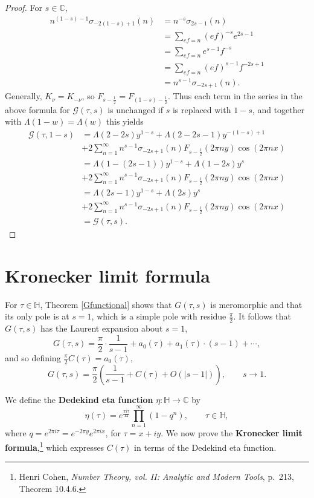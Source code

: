 \documentclass{article}
\theoremstyle{definition}
\begin{document}
\begin{proof}
For $s \in \mathbb{C}$, 
\begin{align*}
n^{(1-s)-1}\sigma_{-2(1-s)+1}(n) &= n^{-s} \sigma_{2s-1}(n) \\
&= \sum_{ef=n} (ef)^{-s} e^{2s-1}\\
&=\sum_{ef=n}e^{s-1} f^{-s}\\
&=\sum_{ef=n} (ef)^{s-1} f^{-2s+1}\\
&=n^{s-1} \sigma_{-2s+1}(n).
\end{align*}
Generally, $K_\nu=K_{-\nu}$, so $F_{s-\frac{1}{2}} = F_{(1-s)-\frac{1}{2}}$. 
Thus each term in the series in the above formula for $\mathcal{G}(\tau,s)$ is unchanged if $s$ is replaced with $1-s$,
and together with $\Lambda(1-w)=\Lambda(w)$ this yields
\begin{align*}
\mathcal{G}(\tau,1-s)&=\Lambda(2-2s)y^{1-s} + \Lambda(2-2s-1)y^{-(1-s)+1}\\
&+2\sum_{n=1}^\infty n^{s-1} \sigma_{-2s+1}(n) F_{s-\frac{1}{2}}(2\pi ny) \cos(2\pi nx)\\
&=\Lambda(1-(2s-1)) y^{1-s}+\Lambda(1-2s)y^s\\
&+2\sum_{n=1}^\infty n^{s-1} \sigma_{-2s+1}(n) F_{s-\frac{1}{2}}(2\pi ny) \cos(2\pi nx)\\
&=\Lambda(2s-1)y^{1-s}+\Lambda(2s)y^s\\
&+2\sum_{n=1}^\infty n^{s-1} \sigma_{-2s+1}(n) F_{s-\frac{1}{2}}(2\pi ny) \cos(2\pi nx)\\
&=\mathcal{G}(\tau,s).
\end{align*}
\end{proof}


\section{Kronecker limit formula}
For $\tau \in \mathbb{H}$,
Theorem \ref{Gfunctional} shows that $G(\tau,s)$ is meromorphic and that its only pole is at $s=1$, which is a simple pole with residue $\frac{\pi}{2}$. It follows that
$G(\tau,s)$ has the Laurent expansion about $s=1$,
\[
G(\tau,s) = \frac{\pi}{2}\cdot \frac{1}{s-1}+a_0(\tau) + a_1(\tau)\cdot (s-1)+\cdots,
\]
and so defining $\frac{\pi}{2}C(\tau)=a_0(\tau)$,
\[
G(\tau,s) = \frac{\pi}{2}\left(\frac{1}{s-1}+C(\tau)+O(|s-1|)\right), \qquad  s \to 1.
\]


We define the \textbf{Dedekind eta function}  $\eta:\mathbb{H} \to \mathbb{C}$ by
\[
\eta(\tau)  = e^{\frac{\pi i\tau}{12}} \prod_{n=1}^\infty (1-q^n), \qquad \tau \in \mathbb{H},
\]
where $q=e^{2\pi i\tau} = e^{-2\pi y}e^{2\pi ix}$, for $\tau=x+iy$. We now prove the \textbf{Kronecker limit formula},\footnote{Henri Cohen, {\em Number Theory, vol. II: Analytic and Modern Tools}, p.~213, Theorem 10.4.6.} which expresses $C(\tau)$ in terms of the Dedekind eta function.
\end{document}
